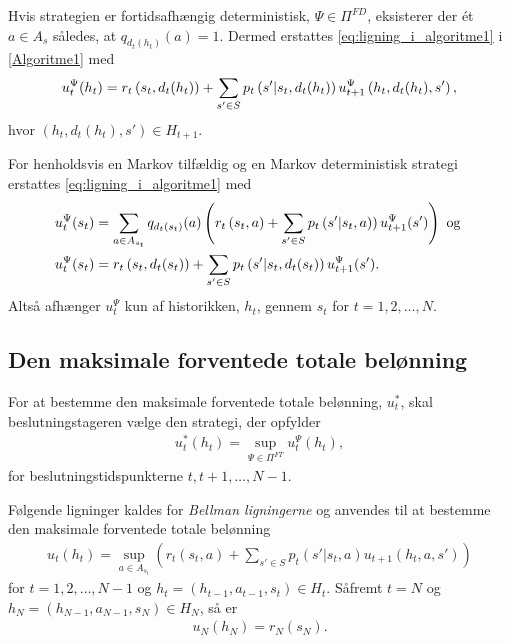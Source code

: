 Hvis strategien er fortidsafhængig deterministisk, $\Psi\in \Pi^{FD}$, eksisterer der ét $a\in A_s$ således, at $q_{d_t(h_t)}(a)=1$. Dermed erstattes \eqref{eq:ligning_i_algoritme1} i \autoref{Algoritme1} med 
\begin{align}\label{eq:uPsi_for_FD}
        \vspace{-0.5cm}u_t^\Psi(h_t) = r_t\left(s_t, d_t(h_t)\right) + \sum_{s' \in S} p_t\left(s'|s_t,d_t(h_t)\right)u_{t+1}^\Psi\left(h_t,d_t(h_t),s'\right),
    \end{align}
hvor $\left(h_t, d_t(h_t), s'\right) \in H_{t+1}$.
 
For henholdsvis en Markov tilfældig og en Markov deterministisk strategi erstattes \eqref{eq:ligning_i_algoritme1} med 
\begin{align*}
        \vspace{-0.5cm}u_t^\Psi(s_t) &=\sum_{a \in A_{s_t}}q_{d_t(s_t)}(a)\left( r_t\left(s_t, a\right) + \sum_{s' \in S} p_t\left(s'|s_t,a)\right)u_{t+1}^\Psi(s')\right) \text{ og }\\
        \vspace{-0.5cm}u_t^\Psi(s_t) &= r_t\left(s_t, d_t(s_t)\right) + \sum_{s' \in S} p_t\left(s'|s_t,d_t(s_t)\right)u_{t+1}^\Psi(s').
\end{align*}
Altså afhænger $u_t^\Psi$ kun af historikken, $h_t$, gennem $s_t$ for $t = 1, 2, \ldots, N$.

\subsection{Den maksimale forventede totale belønning}
For at bestemme den maksimale forventede totale belønning, $u_t^*$, skal beslutningstageren vælge den strategi, der opfylder
\begin{align}\label{eq:u*}
    u_t^*(h_t)=\sup_{\Psi\in\Pi^{FT}}u_t^\Psi(h_t),
\end{align}
for beslutningstidspunkterne $t, t+1,\ldots, N-1$. 

Følgende ligninger kaldes for \textit{Bellman ligningerne} og anvendes til at bestemme den maksimale forventede totale belønning
\begin{align}\label{eq:u_t_sup}
   u_t(h_t)=\sup_{a\in A_{s_t}}\left(r_t(s_t, a)+\sum_{s'\in S}p_t(s'|s_t, a)u_{t+1}(h_t, a, s')\right)
\end{align}
for $t=1, 2, \ldots, N-1$ og $h_t=(h_{t-1}, a_{t-1}, s_t)\in H_t$.
Såfremt $t= N$ og $h_N = (h_{N-1}, a_{N-1}, s_N) \in H_N$, så er 
\begin{align}\label{eq:u_N}
    u_N(h_N) = r_N(s_N). 
\end{align}

